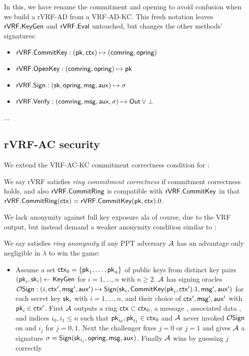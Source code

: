 \def\rSign{\Sign}
\def\rVerify{\Verify}

In this, we have rename the commitment and opening to avoid confusion
when we build a rVRF-AD from a VRF-AD-KC.  This fresh notation leaves
${\mathsf{rVRF}}.{\mathsf{KeyGen}}$ and ${\mathsf{rVRF}}.{\mathsf{Eval}}$ untouched, but
 changes the other methods' signatures:
\begin{itemize}
\item ${\mathsf{rVRF}}.{\mathsf{CommitKey}} : (\mathsf{pk},\mathsf{ctx}) \mapsto (\mathsf{comring},\mathsf{opring})$
\item ${\mathsf{rVRF}}.{\mathsf{OpenKey}} : (\mathsf{comring},\mathsf{opring}) \mapsto \mathsf{pk}$
\item $\rVRF.\rSign : (\sk,\openring,\msg,\aux) \mapsto \sigma$
\item $\rVRF.\rVerify : (\comring,\msg,\aux,\sigma) \mapsto \Out \, \lor \perp$
\end{itemize}

...


\subsection{rVRF-AC security}

We extend the VRF-AC-KC commitment correctness condition for \CommitRing:

\begin{definition}
We say rVRF satisfies {\em ring commitment correctness} if
commitment correctness holds, and also ${\mathsf{rVRF}}.{\mathsf{CommitRing}}$ is 
 compatible with ${\mathsf{rVRF}}.{\mathsf{CommitKey}}$ in that
  ${\mathsf{rVRF}}.{\mathsf{CommitRing}}(\mathsf{ctx}) = {\mathsf{rVRF}}.{\mathsf{CommitKey}}(\mathsf{pk},\mathsf{ctx}).0$.
\end{definition}

We lack anonymity against full key exposure ala
 \cite[pp. 6 Def. 4]{cryptoeprint:2005:304} of course, due to the VRF output,
but instead demand a weaker anonymity condition similar to
 \cite[pp. 5 Def. 3]{cryptoeprint:2005:304}:

\begin{definition}
We say \rVRF satisfies {\em ring anonymity} if
any PPT adversary $\mathcal{A}$ has an advantage only
 negligible in $\lambda$ to win the game:
\begin{itemize}
\item[]
 Assume a set $\mathsf{ctx}_0 = \{ \mathsf{pk}_1,\ldots,\mathsf{pk}_n \}$ of public keys from
 distinct key pairs $(\mathsf{pk}_i,\mathsf{sk}_i) \leftarrow {\ensuremath{\mathsf{KeyGen}}}$ for $i=1,\ldots,n$ with $n \ge 2$.
 $\mathcal{A}$ has signing oracles
 $\ora{Sign} : (i,\ctx',\msg',\aux') \mapsto
  \rSign(\sk_i,\CommitKey(\pk_i,\ctx').1,\msg',\aux')$
 for each secret key $\mathsf{sk}_i$ with $i=1,\ldots,n$, and
 their choice of $\mathsf{ctx}',\mathsf{msg}',\mathsf{aux}'$ with $\mathsf{pk}_i \in \mathsf{ctx}'$.
 First $\mathcal{A}$ outputs a ring $\mathsf{ctx} \subset \mathsf{ctx}_0$,
 a message \msg, associated data \aux, and
 indices $i_0,i_1 \le n$ such that $\mathsf{pk}_{i_0},\mathsf{pk}_{i_1} \in \mathsf{ctx}_0$ and 
 $\mathcal{A}$ never invoked $\mathcal{O}\mathsf{Sign}$ on \msg and $i_j$ for $j=0,1$.
 Next the challenger fixes $j=0$ or $j=1$ and gives
  $\mathcal{A}$ a signature $\sigma = \rSign(\sk_{i_j},\openring,\msg,\aux)$.
 Finally $\mathcal{A}$ wins by guessing $j$ correctly
\end{itemize}
\end{definition}

